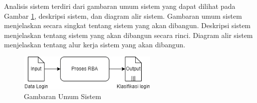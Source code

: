Analisis sistem terdiri dari gambaran umum sistem yang dapat dilihat pada Gambar \ref{fig:gambaran-umum}, deskripsi sistem, dan diagram alir sistem. Gambaran umum sistem menjelaskan secara singkat tentang sistem yang akan dibangun. Deskripsi sistem menjelaskan tentang sistem yang akan dibangun secara rinci. Diagram alir sistem menjelaskan tentang alur kerja sistem yang akan dibangun.

\begin{figure}[H]
    \centering
    \includegraphics[width=0.6\textwidth]{BAB_TESIS/IMAGES/gambaran-umum.png}
    \caption{Gambaran Umum Sistem}
    \label{fig:gambaran-umum}
\end{figure}

